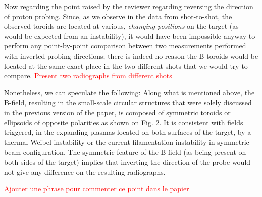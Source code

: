 \documentclass{article}
\begin{document}
\begin{enumerate}
Now regarding the point raised by the reviewer regarding reversing the direction of proton probing. 
%
Since, as we observe in the data from shot-to-shot, the observed toroids are located at various, \emph{changing positions} on the target (as would be expected from an instability), it would have been impossible anyway to perform any point-by-point comparison between two measurements performed with inverted probing directions; there is indeed no reason the B toroids would be located at the same exact place in the two different shots that we would try to compare.
\textcolor{red}{Present two radiographs from different shots}

Nonetheless, we can speculate the following: Along what is mentioned above, the B-field, resulting in the small-scale circular structures that were solely discussed in the previous version of the paper, is composed of symmetric toroids or ellipsoids of opposite polarities as shown on Fig. 2. 
It is consistent with fields triggered, in the expanding plasmas located on both surfaces of the target, by a thermal-Weibel instability or the current filamentation instability in symmetric-beam configuration. 
The symmetric feature of the B-field (as being present on both sides of the target) implies that inverting the direction of the probe would not give any difference on the resulting radiographs.

\textcolor{red}{
Ajouter une phrase pour commenter ce point dans le papier
}


\end{enumerate}
\end{document}

